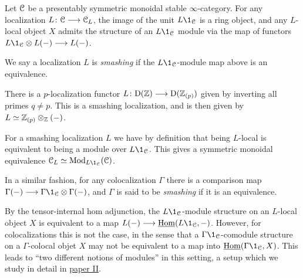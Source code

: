 Let $\EuScript{C}$ be a presentably symmetric monoidal stable $\infty$-category. For any localization $L\colon \EuScript{C}\longrightarrow \EuScript{C}_L$, the image of the unit $L\1_\C$ is a ring object, and any $L$-local object $X$ admits the structure of an $L\1_\C$ module via the map of functors $L\1_\C \otimes L(-)\longrightarrow L(-)$. 

\begin{definition}
    \label{ch0:def:smashing-localization}
    We say a localization $L$ is \emph{smashing} if the $L\1_\C$-module map above is an equivalence. 
\end{definition}

\begin{example}
    \label{ch0:ex:p-localization-ab-smashing}
    There is a $p$-localization functor $L\colon\mathrm{D}(\mathbb{Z})\longrightarrow \mathrm{D}(\mathbb{Z}_{(p)})$ given by inverting all primes $q\neq p$. This is a smashing localization, and is then given by $L \simeq \mathbb{Z}_{(p)}\otimes_{\mathbb{Z}} (-)$. 
\end{example}

\begin{remark}
    \label{ch0:rm:smashing-then-modules-over-unit}
    For a smashing localization $L$ we have by definition that being $L$-local is equivalent to being a module over $L\1_\C$. This gives a symmetric monoidal equivalence $\C_L \simeq \Mod_{L\1_\C}(\C)$. 
\end{remark}

\begin{definition}
    \label{ch0:rm:smashing-colocalization}
    In a similar fashion, for any colocalization $\Gamma$ there is a comparison map $\Gamma (-)\to \Gamma \1_\C \otimes \Gamma(-)$, and $\Gamma$ is said to be \emph{smashing} if it is an equivalence. 
\end{definition}

\begin{remark}
    \label{ch0:rm:L1-module-adjoint-map}
    By the tensor-internal hom adjunction, the $L\1_\C$-module structure on an $L$-local object $X$ is equivalent to a map $L(-)\to \iHom(L\1_\C,-)$. However, for colocalizations this is not the case, in the sense that a $\Gamma\1_\C$-comodule structure on a $\Gamma$-colocal objet $X$ may not be equivalent to a map into $\iHom(\Gamma \1_\C, X)$. This leads to ``two different notions of modules'' in this setting, a setup which we study in detail in \hyperref[ch2]{paper II}.
\end{remark}

